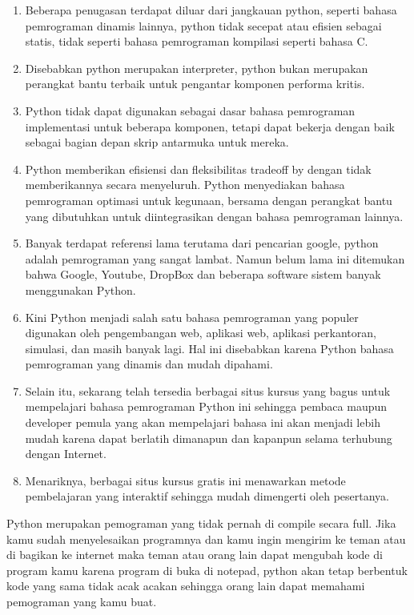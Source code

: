 \begin{enumerate}
\item Beberapa penugasan terdapat diluar dari jangkauan python, seperti bahasa pemrograman dinamis lainnya, python tidak secepat atau efisien sebagai statis, tidak seperti bahasa pemrograman kompilasi seperti bahasa C. 
\item Disebabkan python merupakan interpreter, python bukan merupakan perangkat bantu terbaik untuk pengantar komponen performa kritis.
\item Python tidak dapat digunakan sebagai dasar bahasa pemrograman implementasi untuk beberapa komponen, tetapi dapat bekerja dengan baik sebagai bagian depan skrip antarmuka untuk mereka.
\item Python memberikan efisiensi dan fleksibilitas tradeoff by dengan tidak memberikannya secara menyeluruh. Python menyediakan bahasa pemrograman optimasi untuk kegunaan, bersama dengan perangkat bantu yang dibutuhkan untuk diintegrasikan dengan bahasa pemrograman lainnya.
\item Banyak terdapat referensi lama terutama dari pencarian google, python adalah pemrograman yang sangat lambat. Namun belum lama ini ditemukan bahwa Google, Youtube, DropBox dan beberapa software sistem banyak menggunakan Python.
\item Kini Python menjadi salah satu bahasa pemrograman yang populer digunakan oleh pengembangan web, aplikasi web, aplikasi perkantoran, simulasi, dan masih banyak lagi. Hal ini disebabkan karena Python bahasa pemrograman yang dinamis dan mudah dipahami.
\item Selain itu, sekarang telah tersedia berbagai situs kursus yang bagus untuk mempelajari bahasa pemrograman Python ini sehingga pembaca maupun developer pemula yang akan mempelajari bahasa ini akan menjadi lebih mudah karena dapat berlatih dimanapun dan kapanpun selama terhubung dengan Internet.
\item Menariknya, berbagai situs kursus gratis ini menawarkan metode pembelajaran yang interaktif sehingga mudah dimengerti oleh pesertanya.
\end{enumerate}
Python merupakan pemograman yang tidak pernah di compile secara full. Jika kamu sudah menyelesaikan programnya dan kamu ingin mengirim ke teman atau di bagikan ke internet maka teman atau orang lain dapat mengubah kode di program kamu karena program di buka di notepad, python akan tetap berbentuk kode yang sama tidak acak acakan sehingga orang lain dapat memahami pemograman yang kamu buat.


